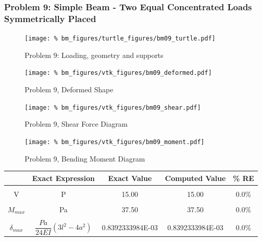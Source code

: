 \subsubsection{Problem 9: Simple Beam - Two Equal Concentrated Loads Symmetrically Placed}
\begin{figure}[h]
    \texttt{[image: \%
                            bm\_figures/turtle\_figures/bm09\_turtle.pdf]}
    \centering
    \caption{Problem 9: Loading, geometry and supports}
    \label{fig:bm09_turtle}
\end{figure}


\begin{figure}[!htb]
    \texttt{[image: \%
                     bm\_figures/vtk\_figures/bm09\_deformed.pdf]}
    \centering
    \caption{Problem 9, Deformed Shape}
    \label{fig:bm09_deformed}
\end{figure}
\begin{figure}[!htb]
    \texttt{[image: \%
                     bm\_figures/vtk\_figures/bm09\_shear.pdf]}
    \centering
    \caption{Problem 9, Shear Force Diagram}
    \label{fig:bm09_shear}
\end{figure}
\begin{figure}[!htb]
    \texttt{[image: \%
                     bm\_figures/vtk\_figures/bm09\_moment.pdf]}
    \centering
    \caption{Problem 9, Bending Moment Diagram}
    \label{fig:bm09_moment}
\end{figure}
\begin{table}[h!]
\centering
\begin{tabular}{ c| c c c c }
    & Exact Expression & Exact Value & Computed Value & \% RE \\ \hline \\
    V   & P & 15.00 & 15.00 & 0.0\% \\ \\
    $M_{max}$ & Pa & 37.50 & 37.50 & 0.0\% \\ \\
    $\delta_{max}$ & $\dfrac{Pa}{24EI}(3l^2 - 4a^2)$ & 0.8392333984E-03 & 0.8392333984E-03 & 0.0\% \\
\end{tabular}
\end{table}

%
%

\clearpage
